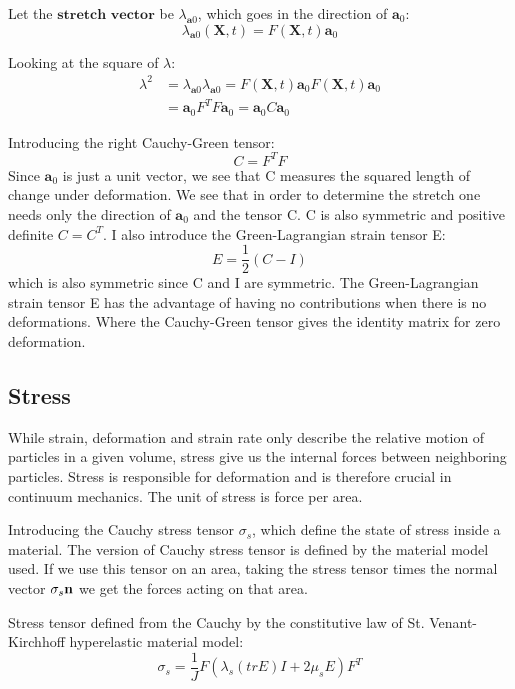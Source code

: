 Let the $\textbf{stretch vector}$ be $\lambda_{\textbf{a}0}$, which goes in the direction of $\textbf{a}_0$: 
\begin{equation}
\lambda_{\textbf{a}0}(\textbf{X},t) = F(\textbf{X},t)\textbf{a}_0 
\end{equation}

Looking at the square of $\lambda$:
\begin{align}
\lambda^2 &=  \lambda_{\textbf{a}0} \lambda_{\textbf{a}0} = F(\textbf{X},t)\textbf{a}_0 F(\textbf{X},t)\textbf{a}_0 \\
&= \textbf{a}_0 F^TF\textbf{a}_0 = \textbf{a}_0 C \textbf{a}_0
\end{align}

Introducing the right Cauchy-Green tensor:
 \begin{equation}
 C = F^TF
\end{equation}
Since $\textbf{a}_0 $ is just a unit vector, we see that C measures the squared length of change under deformation. We see that in order to determine the stretch one needs only the direction of $\textbf{a}_0$ and the tensor C.
C is also symmetric and positive definite $C = C^T$.  I also introduce the Green-Lagrangian strain tensor E:
\begin{equation}\label{eq:StrainTensor}
E = \frac{1}{2}(C - I) 
\end{equation}
which is also symmetric since C and I are symmetric. The Green-Lagrangian strain tensor E has the advantage of having no contributions when there is no deformations. Where the Cauchy-Green tensor gives the identity matrix for zero deformation.
		
\subsection{Stress}
While strain, deformation and strain rate only describe the relative motion of particles in a given volume, stress give us the internal forces between neighboring particles. Stress is responsible for deformation and is therefore crucial in continuum mechanics. The unit of stress is force per area.

Introducing the Cauchy stress tensor $\sigma_s$, which define the state of stress inside a material. The version of Cauchy stress tensor is defined by the material model used. 
If we use this tensor on an area, taking the stress tensor times the normal vector $\sigma_s \bold{n}$ we get the forces acting on that area.

Stress tensor defined from the Cauchy by the constitutive law of St. Venant-Kirchhoff hyperelastic material model: 
\begin{equation}
 \sigma_s = \frac{1}{J} F(\lambda_s (tr E)I + 2\mu_sE) F^T
\end{equation}

